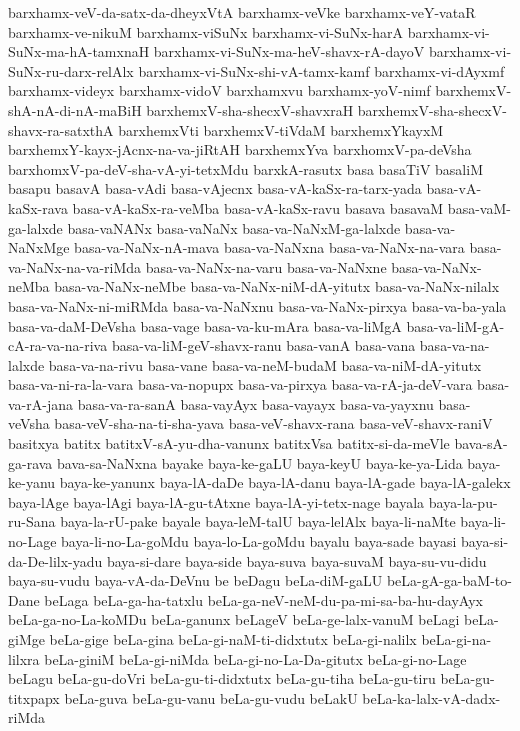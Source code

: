 {barxhamx-veV-da-satx-da-dheyxVtA
barxhamx-veVke
barxhamx-veY-vataR
barxhamx-ve-nikuM
barxhamx-viSuNx
barxhamx-vi-SuNx-harA
barxhamx-vi-SuNx-ma-hA-tamxnaH
barxhamx-vi-SuNx-ma-heV-shavx-rA-dayoV
barxhamx-vi-SuNx-ru-darx-relAlx
barxhamx-vi-SuNx-shi-vA-tamx-kamf
barxhamx-vi-dAyxmf
barxhamx-videyx
barxhamx-vidoV
barxhamxvu
barxhamx-yoV-nimf
barxhemxV-shA-nA-di-nA-maBiH
barxhemxV-sha-shecxV-shavxraH
barxhemxV-sha-shecxV-shavx-ra-satxthA
barxhemxVti
barxhemxV-tiVdaM
barxhemxYkayxM
barxhemxY-kayx-jAcnx-na-va-jiRtAH
barxhemxYva
barxhomxV-pa-deVsha
barxhomxV-pa-deV-sha-vA-yi-tetxMdu
barxkA-rasutx
basa
basaTiV
basaliM
basapu
basavA
basa-vAdi
basa-vAjecnx
basa-vA-kaSx-ra-tarx-yada
basa-vA-kaSx-rava
basa-vA-kaSx-ra-veMba
basa-vA-kaSx-ravu
basava
basavaM
basa-vaM-ga-lalxde
basa-vaNANx
basa-vaNaNx
basa-va-NaNxM-ga-lalxde
basa-va-NaNxMge
basa-va-NaNx-nA-mava
basa-va-NaNxna
basa-va-NaNx-na-vara
basa-va-NaNx-na-va-riMda
basa-va-NaNx-na-varu
basa-va-NaNxne
basa-va-NaNx-neMba
basa-va-NaNx-neMbe
basa-va-NaNx-niM-dA-yitutx
basa-va-NaNx-nilalx
basa-va-NaNx-ni-miRMda
basa-va-NaNxnu
basa-va-NaNx-pirxya
basa-va-ba-yala
basa-va-daM-DeVsha
basa-vage
basa-va-ku-mAra
basa-va-liMgA
basa-va-liM-gA-cA-ra-va-na-riva
basa-va-liM-geV-shavx-ranu
basa-vanA
basa-vana
basa-va-na-lalxde
basa-va-na-rivu
basa-vane
basa-va-neM-budaM
basa-va-niM-dA-yitutx
basa-va-ni-ra-la-vara
basa-va-nopupx
basa-va-pirxya
basa-va-rA-ja-deV-vara
basa-va-rA-jana
basa-va-ra-sanA
basa-vayAyx
basa-vayayx
basa-va-yayxnu
basa-veVsha
basa-veV-sha-na-ti-sha-yava
basa-veV-shavx-rana
basa-veV-shavx-raniV
basitxya
batitx
batitxV-sA-yu-dha-vanunx
batitxVsa
batitx-si-da-meVle
bava-sA-ga-rava
bava-sa-NaNxna
bayake
baya-ke-gaLU
baya-keyU
baya-ke-ya-Lida
baya-ke-yanu
baya-ke-yanunx
baya-lA-daDe
baya-lA-danu
baya-lA-gade
baya-lA-galekx
baya-lAge
baya-lAgi
baya-lA-gu-tAtxne
baya-lA-yi-tetx-nage
bayala
baya-la-pu-ru-Sana
baya-la-rU-pake
bayale
baya-leM-talU
baya-lelAlx
baya-li-naMte
baya-li-no-Lage
baya-li-no-La-goMdu
baya-lo-La-goMdu
bayalu
baya-sade
bayasi
baya-si-da-De-lilx-yadu
baya-si-dare
baya-side
baya-suva
baya-suvaM
baya-su-vu-didu
baya-su-vudu
baya-vA-da-DeVnu
be
beDagu
beLa-diM-gaLU
beLa-gA-ga-baM-to-Dane
beLaga
beLa-ga-ha-tatxlu
beLa-ga-neV-neM-du-pa-mi-sa-ba-hu-dayAyx
beLa-ga-no-La-koMDu
beLa-ganunx
beLageV
beLa-ge-lalx-vanuM
beLagi
beLa-giMge
beLa-gige
beLa-gina
beLa-gi-naM-ti-didxtutx
beLa-gi-nalilx
beLa-gi-na-lilxra
beLa-giniM
beLa-gi-niMda
beLa-gi-no-La-Da-gitutx
beLa-gi-no-Lage
beLagu
beLa-gu-doVri
beLa-gu-ti-didxtutx
beLa-gu-tiha
beLa-gu-tiru
beLa-gu-titxpapx
beLa-guva
beLa-gu-vanu
beLa-gu-vudu
beLakU
beLa-ka-lalx-vA-dadx-riMda
}

